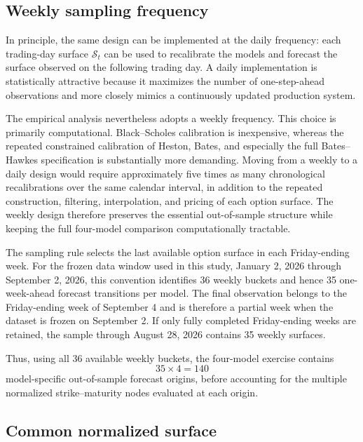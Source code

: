 \subsection{Weekly sampling frequency}
\label{subsec:weekly_frequency}

In principle, the same design can be implemented at the daily frequency:
each trading-day surface $\mathcal{S}_t$ can be used to recalibrate the models
and forecast the surface observed on the following trading day.  A daily
implementation is statistically attractive because it maximizes the number of
one-step-ahead observations and more closely mimics a continuously updated
production system.

The empirical analysis nevertheless adopts a weekly frequency.  This choice is
primarily computational.  Black--Scholes calibration is inexpensive, whereas
the repeated constrained calibration of Heston, Bates, and especially the full
Bates--Hawkes specification is substantially more demanding.  Moving from a
weekly to a daily design would require approximately five times as many
chronological recalibrations over the same calendar interval, in addition to
the repeated construction, filtering, interpolation, and pricing of each
option surface.  The weekly design therefore preserves the essential
out-of-sample structure while keeping the full four-model comparison
computationally tractable.

The sampling rule selects the last available option surface in each
Friday-ending week.  For the frozen data window used in this study,
January 2, 2026 through September 2, 2026, this convention identifies 36
weekly buckets and hence 35 one-week-ahead forecast transitions per model.
The final observation belongs to the Friday-ending week of September 4 and is
therefore a partial week when the dataset is frozen on September 2.  If only
fully completed Friday-ending weeks are retained, the sample through
August 28, 2026 contains 35 weekly surfaces.

Thus, using all 36 available weekly buckets, the four-model exercise contains
\begin{equation}
    35 \times 4 = 140
\end{equation}
model-specific out-of-sample forecast origins, before accounting for the
multiple normalized strike--maturity nodes evaluated at each origin.

\subsection{Common normalized surface}
\label{subsec:normalized_surface}

